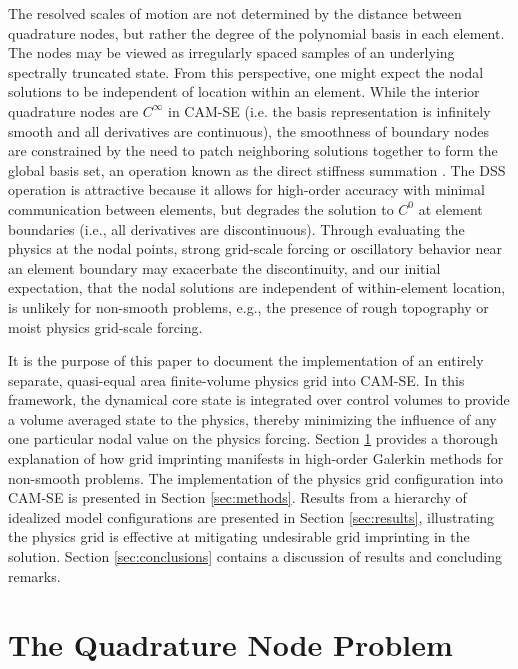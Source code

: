 \documentclass[twocol]{ametsoc}
\begin{document}
The resolved scales of motion are not determined by the distance between quadrature nodes, but rather the degree of the polynomial basis in each element. The nodes may be viewed as irregularly spaced samples of an underlying spectrally truncated state. From this perspective, one might expect the nodal solutions to be independent of location within an element. While the interior quadrature nodes are $C^{\infty}$ in CAM-SE (i.e. the basis representation is infinitely smooth and all derivatives are continuous), the smoothness of boundary nodes are constrained by the need to patch neighboring solutions together to form the global basis set, an operation known as the direct stiffness summation \citep[DSS; ][]{MadayPatera87,canuto2007}. The DSS operation is attractive because it allows for high-order accuracy with minimal communication between elements, but degrades the solution to $C^0$ at element boundaries (i.e., all derivatives are discontinuous). Through evaluating the physics at the nodal points, strong grid-scale forcing or oscillatory behavior near an element boundary may exacerbate the discontinuity, and our initial expectation, that the nodal solutions are independent of within-element location, is unlikely for non-smooth problems, e.g., the presence of rough topography or moist physics grid-scale forcing.

It is the purpose of this paper to document the implementation of an entirely separate, quasi-equal area finite-volume physics grid into CAM-SE. In this framework, the dynamical core state is integrated over control volumes to provide a volume averaged state to the physics, thereby minimizing the influence of any one particular nodal value on the physics forcing. Section \ref{sec:nodeproblem} provides a thorough explanation of how grid imprinting manifests in high-order Galerkin methods for non-smooth problems. The implementation of the physics grid configuration into CAM-SE is presented in Section \ref{sec:methods}. Results from a hierarchy of idealized model configurations are presented in Section \ref{sec:results}, illustrating the physics grid is effective at mitigating undesirable grid imprinting in the solution. Section \ref{sec:conclusions} contains a discussion of results and concluding remarks.

\section{{\color{red}The Quadrature Node Problem{}}}\label{sec:nodeproblem}
\end{document}
